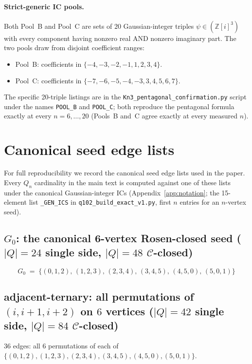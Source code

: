 \documentclass[12pt,a4paper]{article}
\theoremstyle{definition}
\theoremstyle{remark}
\newcommand{\bZi}{\mathbb{Z}[i]}            %
\newcommand{\Qn}{Q_n}
\newcommand{\Ccls}{\mathcal{C}}             %
\begin{document}
\paragraph{Strict-generic IC pools.}
Both Pool~B and Pool~C are sets of $20$ Gaussian-integer triples
$\psi \in (\bZi^3)$ with every component having nonzero real AND
nonzero imaginary part. The two pools draw from disjoint coefficient
ranges:
\begin{itemize}[leftmargin=2em,topsep=2pt,itemsep=2pt]
\item Pool~B: coefficients in $\{-4, -3, -2, -1, 1, 2, 3, 4\}$.
\item Pool~C: coefficients in $\{-7, -6, -5, -4, -3, 3, 4, 5, 6, 7\}$.
\end{itemize}
The specific 20-triple listings are in the
\texttt{Kn3\_pentagonal\_confirmation.py} script under the names
\texttt{POOL\_B} and \texttt{POOL\_C}; both reproduce the pentagonal
formula exactly at every $n = 6, \dots, 20$ (Pools~B and~C agree
exactly at every measured $n$).

\section{Canonical seed edge lists}\label{app:canonical-seeds}

For full reproducibility we record the canonical seed edge lists used
in the paper. Every $\Qn$ cardinality in the main text is computed
against one of these lists under the canonical Gaussian-integer ICs
(Appendix~\ref{app:notation}; the 15-element list \texttt{\_GEN\_ICS}
in \texttt{q102\_build\_exact\_v1.py}, first $n$ entries for an
$n$-vertex seed).

\subsection*{$G_0$: the canonical 6-vertex Rosen-closed seed
($|Q| = 24$ single side, $|Q| = 48$ $\Ccls$-closed)}

\[
G_0 \;=\; \{
  (0,1,2),\, (1,2,3),\, (2,3,4),\, (3,4,5),\, (4,5,0),\, (5,0,1)
\}
\]

\subsection*{adjacent-ternary: all permutations of $(i, i{+}1, i{+}2)$
on $6$ vertices ($|Q| = 42$ single side, $|Q| = 84$ $\Ccls$-closed)}

$36$ edges: all $6$ permutations of each of $\{(0,1,2), (1,2,3), (2,3,4),
(3,4,5), (4,5,0), (5,0,1)\}$.
\end{document}
